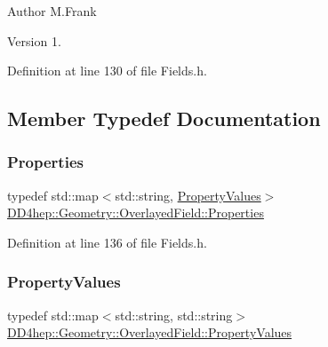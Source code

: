 \begin{DoxyAuthor}{Author}
M.\+Frank 
\end{DoxyAuthor}
\begin{DoxyVersion}{Version}
1. 
\end{DoxyVersion}


Definition at line 130 of file Fields.\+h.



\subsection{Member Typedef Documentation}
\hypertarget{class_d_d4hep_1_1_geometry_1_1_overlayed_field_acdf81fbf8e0c336cb724ee2846a2c5b0}{}\label{class_d_d4hep_1_1_geometry_1_1_overlayed_field_acdf81fbf8e0c336cb724ee2846a2c5b0} 
\subsubsection{\texorpdfstring{Properties}{Properties}}
{\footnotesize\ttfamily typedef std\+::map$<$std\+::string, \hyperlink{class_d_d4hep_1_1_geometry_1_1_overlayed_field_ade93bff8af042a76d9d25e1f7072b532}{Property\+Values}$>$ \hyperlink{class_d_d4hep_1_1_geometry_1_1_overlayed_field_acdf81fbf8e0c336cb724ee2846a2c5b0}{D\+D4hep\+::\+Geometry\+::\+Overlayed\+Field\+::\+Properties}}



Definition at line 136 of file Fields.\+h.

\hypertarget{class_d_d4hep_1_1_geometry_1_1_overlayed_field_ade93bff8af042a76d9d25e1f7072b532}{}\label{class_d_d4hep_1_1_geometry_1_1_overlayed_field_ade93bff8af042a76d9d25e1f7072b532} 
\subsubsection{\texorpdfstring{Property\+Values}{PropertyValues}}
{\footnotesize\ttfamily typedef std\+::map$<$std\+::string, std\+::string$>$ \hyperlink{class_d_d4hep_1_1_geometry_1_1_overlayed_field_ade93bff8af042a76d9d25e1f7072b532}{D\+D4hep\+::\+Geometry\+::\+Overlayed\+Field\+::\+Property\+Values}}



